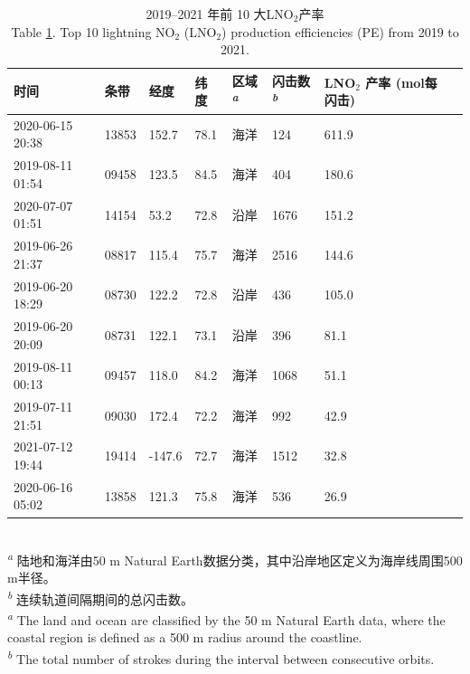 \begin{table}[!htbp]
\centering
\caption{2019--2021 年前 10 大LNO$_2$产率 \\
Table \ref{table:arctic_pe_lno2}.
Top 10 lightning NO$_2$ (LNO$_2$) production efficiencies (PE) from 2019 to 2021.}
\label{table:arctic_pe_lno2}
\begin{tabular}{llllllll}
\hline
时间 &       条带 &   经度 &   纬度 &
区域\textsuperscript{\emph{a}} &
闪击数\textsuperscript{\emph{b}}  & \shortstack{LNO$_2$ 产率 \\ (mol每闪击)} \\
\hline
2020-06-15 20:38 &  13853 &      152.7 &      78.1 &       海洋 &         124 &    611.9 \\
2019-08-11 01:54 &  09458 &      123.5 &      84.5 &       海洋 &         404 &    180.6 \\
2020-07-07 01:51 &  14154 &       53.2 &      72.8 &       沿岸 &        1676 &    151.2 \\
2019-06-26 21:37 &  08817 &      115.4 &      75.7 &       海洋 &        2516 &    144.6 \\
2019-06-20 18:29 &  08730 &      122.2 &      72.8 &       沿岸 &         436 &    105.0 \\
2019-06-20 20:09 &  08731 &      122.1 &      73.1 &       沿岸 &         396 &     81.1 \\
2019-08-11 00:13 &  09457 &      118.0 &      84.2 &       海洋 &        1068 &     51.1 \\
2019-07-11 21:51 &  09030 &      172.4 &      72.2 &       海洋 &         992 &     42.9 \\
2021-07-12 19:44 &  19414 &     -147.6 &      72.7 &       海洋 &        1512 &     32.8 \\
2020-06-16 05:02 &  13858 &      121.3 &      75.8 &       海洋 &         536 &     26.9 \\
\hline
\end{tabular}
\footnotesize\\
\textsuperscript{\emph{a}} 陆地和海洋由50 m Natural Earth数据分类，其中沿岸地区定义为海岸线周围500 m半径。 \\
\textsuperscript{\emph{b}} 连续轨道间隔期间的总闪击数。\\
\textsuperscript{\emph{a}} The land and ocean are classified by the 50 m Natural Earth data, where the coastal region is defined as a 500 m radius around the coastline. \\
\textsuperscript{\emph{b}} The total number of strokes during the interval between consecutive orbits.
\end{table}


